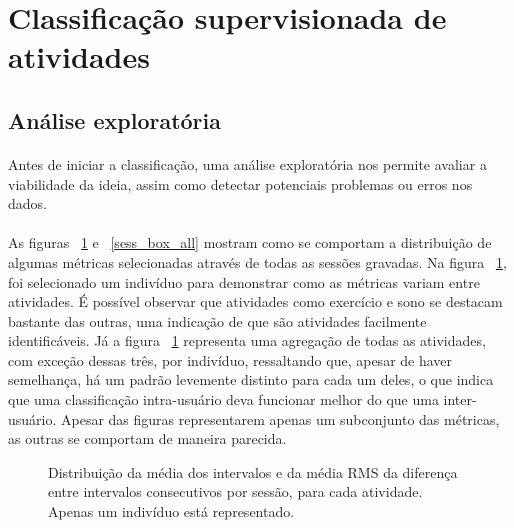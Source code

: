         
    \section{Classificação supervisionada de atividades}
    \label{classif}
    
        \subsection{Análise exploratória}
        \label{anaexp}
            
            \paragraph{} Antes de iniciar a classificação, uma análise exploratória nos permite avaliar a viabilidade da ideia, assim como detectar potenciais problemas ou erros nos dados. 
            \paragraph{}As figuras ~\ref{sess_box_ronald} e ~\ref{sess_box_all} mostram como se comportam a distribuição de algumas métricas selecionadas através de todas as sessões gravadas. Na figura ~\ref{sess_box_ronald}, foi selecionado um indivíduo para demonstrar como as métricas variam entre atividades. É possível observar que atividades como exercício e sono se destacam bastante das outras, uma indicação de que são atividades facilmente identificáveis. Já a figura ~\ref{sess_box_ronald} representa uma agregação de todas as atividades, com exceção dessas três, por indivíduo, ressaltando que, apesar de haver semelhança, há um padrão levemente distinto para cada um deles, o que indica que uma classificação intra-usuário deva funcionar melhor do que uma inter-usuário. Apesar das figuras representarem apenas um subconjunto das métricas, as outras se comportam de maneira parecida.
      
      
            \begin{figure}[h!]
                \centering
                \caption{Distribuição da média dos intervalos e da média RMS da diferença entre intervalos consecutivos por sessão, para cada atividade. Apenas um indivíduo está representado.}
                \label{sess_box_ronald}
            \end{figure}

